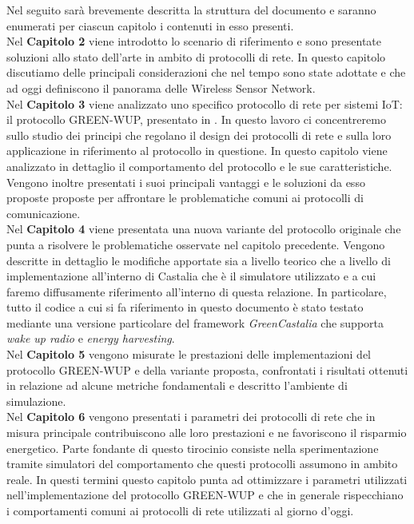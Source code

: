 \documentclass[binding=0.6cm,TFA]{sapthesis}
\begin{document}
Nel seguito sarà brevemente descritta la struttura del documento e saranno enumerati per ciascun capitolo i contenuti in esso presenti.\\

Nel \textbf{Capitolo 2} viene introdotto lo scenario di riferimento e sono presentate soluzioni allo stato dell'arte in ambito di protocolli di rete. In questo
capitolo discutiamo delle principali considerazioni che nel tempo sono state adottate e che ad oggi definiscono il panorama delle Wireless Sensor Network.\\

Nel \textbf{Capitolo 3} viene analizzato uno specifico protocollo di rete per sistemi IoT: il protocollo GREEN-WUP, presentato in \cite{novel-wake-up-receiver-paper}.
In questo lavoro ci concentreremo sullo studio dei principi che regolano il design dei protocolli di rete e sulla loro applicazione in riferimento al
protocollo in questione. In questo capitolo viene analizzato in dettaglio il comportamento del protocollo e le sue caratteristiche. Vengono inoltre presentati i
suoi principali vantaggi e le soluzioni da esso proposte proposte per affrontare le problematiche comuni ai protocolli di comunicazione.\\

Nel \textbf{Capitolo 4} viene presentata una nuova variante del protocollo originale che punta a risolvere le problematiche osservate nel capitolo precedente.
Vengono descritte in dettaglio le modifiche apportate sia a livello teorico che a livello di implementazione all'interno di Castalia che è
il simulatore utilizzato e a cui faremo diffusamente riferimento all'interno di questa relazione. In particolare, tutto il codice
a cui si fa riferimento in questo documento è stato testato mediante una versione particolare del framework \emph{GreenCastalia} \cite{greencastalia-paper}
che supporta \emph{wake up radio} e \emph{energy harvesting}.\\

Nel \textbf{Capitolo 5} vengono misurate le prestazioni delle implementazioni del protocollo GREEN-WUP e della variante proposta,
confrontati i risultati ottenuti in relazione ad alcune metriche fondamentali e descritto l'ambiente di simulazione.\\

Nel \textbf{Capitolo 6} vengono presentati i parametri dei protocolli di rete che in misura principale contribuiscono alle loro prestazioni e ne favoriscono
il risparmio energetico. Parte fondante di questo tirocinio consiste nella sperimentazione tramite simulatori del comportamento che questi protocolli
assumono in ambito reale. In questi termini questo capitolo punta ad ottimizzare i parametri utilizzati nell'implementazione del protocollo GREEN-WUP e
che in generale rispecchiano i comportamenti comuni ai protocolli di rete utilizzati al giorno d'oggi.\\
\end{document}
